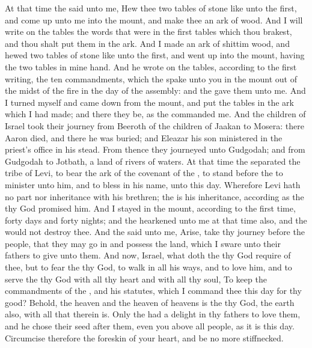 \begin{biblechapter} %
 At that time the \LORD said unto me, Hew thee two tables of stone like unto the first, and come up unto me into the mount, and make thee an ark of wood.
\verse And I will write on the tables the words that were in the first tables which thou brakest, and thou shalt put them in the ark.
\verse And I made an ark of shittim wood, and hewed two tables of stone like unto the first, and went up into the mount, having the two tables in mine hand.
\verse And he wrote on the tables, according to the first writing, the ten commandments, which the \LORD spake unto you in the mount out of the midst of the fire in the day of the assembly: and the \LORD gave them unto me.
\verse And I turned myself and came down from the mount, and put the tables in the ark which I had made; and there they be, as the \LORD commanded me.
\verse And the children of Israel took their journey from Beeroth of the children of Jaakan to Mosera: there Aaron died, and there he was buried; and Eleazar his son ministered in the priest's office in his stead.
\verse From thence they journeyed unto Gudgodah; and from Gudgodah to Jotbath, a land of rivers of waters.
\verse At that time the \LORD separated the tribe of Levi, to bear the ark of the covenant of the \LORD, to stand before the \LORD to minister unto him, and to bless in his name, unto this day.
\verse Wherefore Levi hath no part nor inheritance with his brethren; the \LORD is his inheritance, according as the \LORD thy God promised him.
\verse And I stayed in the mount, according to the first time, forty days and forty nights; and the \LORD hearkened unto me at that time also, and the \LORD would not destroy thee.
\verse And the \LORD said unto me, Arise, take thy journey before the people, that they may go in and possess the land, which I sware unto their fathers to give unto them.
 And now, Israel, what doth the \LORD thy God require of thee, but to fear the \LORD thy God, to walk in all his ways, and to love him, and to serve the \LORD thy God with all thy heart and with all thy soul,
\verse To keep the commandments of the \LORD, and his statutes, which I command thee this day for thy good?
\verse Behold, the heaven and the heaven of heavens is the \LORDs thy God, the earth also, with all that therein is.
\verse Only the \LORD had a delight in thy fathers to love them, and he chose their seed after them, even you above all people, as it is this day.
\verse Circumcise therefore the foreskin of your heart, and be no more stiffnecked.

\end{biblechapter}
